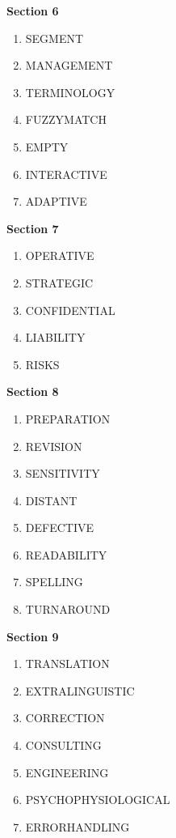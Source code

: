 \textbf{Section 6}

\begin{enumerate}
    \item SEGMENT
    \item MANAGEMENT
    \item TERMINOLOGY
    \item FUZZYMATCH
    \item EMPTY
    \item INTERACTIVE
    \item ADAPTIVE
\end{enumerate}

\textbf{Section 7}

\begin{enumerate}
    \item OPERATIVE
    \item STRATEGIC
    \item CONFIDENTIAL
    \item LIABILITY
    \item RISKS
\end{enumerate}

\textbf{Section 8}

\begin{enumerate}
    \item PREPARATION
    \item REVISION
    \item SENSITIVITY
    \item DISTANT
    \item DEFECTIVE
    \item READABILITY
    \item SPELLING
    \item TURNAROUND
\end{enumerate}

\textbf{Section 9}

\begin{enumerate}
    \item TRANSLATION
    \item EXTRALINGUISTIC
    \item CORRECTION
    \item CONSULTING
    \item ENGINEERING
    \item PSYCHOPHYSIOLOGICAL
    \item ERRORHANDLING
\end{enumerate}
